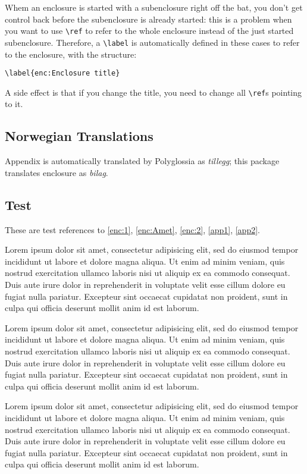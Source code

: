 \documentclass[unrestrictedsummary]{sintefreport}
\begin{document}
Whem an enclosure is started with a subenclosure right off the bat, you don't
get control back before the subenclosure is already started: this is a problem
when you want to use \verb|\ref| to refer to the whole enclosure instead of the
just started subenclosure.
Therefore, a \verb|\label| is automatically defined in these cases to refer to
the enclosure, with the structure:
\begin{verbatim}
\label{enc:Enclosure title}
\end{verbatim}
A side effect is that if you change the title, you need to change all
\verb|\ref|s pointing to it.

\subsection{Norwegian Translations}
Appendix is automatically translated by Polyglossia as \emph{tillegg}; this
package translates enclosure as \emph{bilag}.

\subsection{Test}
These are test references to \ref{enc:1}, \ref{enc:Amet}, \ref{enc:2},
\ref{app1}, \ref{app2}.

\enclosures
{}
\label{enc:1}
Lorem ipsum dolor sit amet, consectetur adipisicing elit, sed do eiusmod tempor
incididunt ut labore et dolore magna aliqua. Ut enim ad minim veniam, quis
nostrud exercitation ullamco laboris nisi ut aliquip ex ea commodo consequat.
Duis aute irure dolor in reprehenderit in voluptate velit esse cillum dolore eu
fugiat nulla pariatur. Excepteur sint occaecat cupidatat non proident, sunt in
culpa qui officia deserunt mollit anim id est laborum.

Lorem ipsum dolor sit amet, consectetur adipisicing elit, sed do eiusmod tempor
incididunt ut labore et dolore magna aliqua. Ut enim ad minim veniam, quis
nostrud exercitation ullamco laboris nisi ut aliquip ex ea commodo consequat.
Duis aute irure dolor in reprehenderit in voluptate velit esse cillum dolore eu
fugiat nulla pariatur. Excepteur sint occaecat cupidatat non proident, sunt in
culpa qui officia deserunt mollit anim id est laborum.

Lorem ipsum dolor sit amet, consectetur adipisicing elit, sed do eiusmod tempor
incididunt ut labore et dolore magna aliqua. Ut enim ad minim veniam, quis
nostrud exercitation ullamco laboris nisi ut aliquip ex ea commodo consequat.
Duis aute irure dolor in reprehenderit in voluptate velit esse cillum dolore eu
fugiat nulla pariatur. Excepteur sint occaecat cupidatat non proident, sunt in
culpa qui officia deserunt mollit anim id est laborum.
\end{document}
